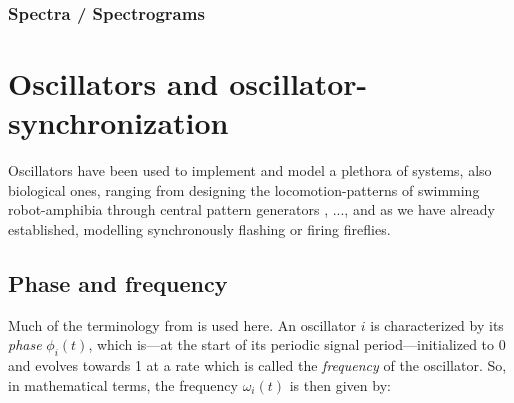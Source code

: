 		\subsubsection{Spectra / Spectrograms}




\section{Oscillators and oscillator-synchronization}





 \nl



Oscillators have been used to implement and model a plethora of systems, also biological ones, ranging from designing the locomotion-patterns of swimming robot-amphibia through central pattern generators \cite{ijspeert_cpg}, ..., and as we have already established, modelling synchronously flashing or firing fireflies.
	
	
	\subsection{Phase and frequency}
	Much of the terminology from \cite{nymoen_synch} is used here. An oscillator $i$ is characterized by its \textit{phase} $\phi_i(t)$, which is—at the start of its periodic signal period—initialized to 0 and evolves towards 1 at a rate which is called the \textit{frequency} of the oscillator. So, in mathematical terms, the frequency $\omega_i(t)$ is then given by:
	
